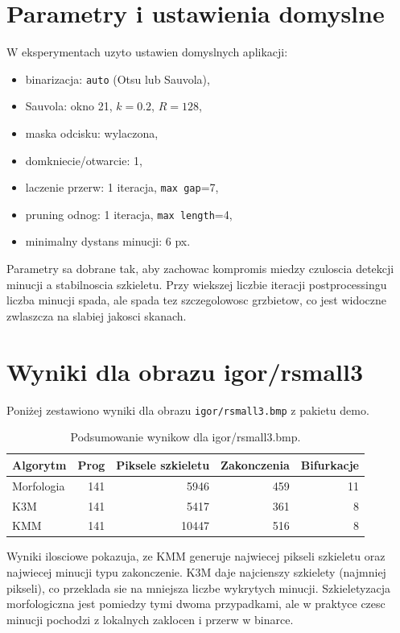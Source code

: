 \documentclass[12pt,a4paper]{article}
\begin{document}
\section{Parametry i ustawienia domyslne}

W eksperymentach uzyto ustawien domyslnych aplikacji:
\begin{itemize}
    \item binarizacja: \texttt{auto} (Otsu lub Sauvola),
    \item Sauvola: okno 21, \(k=0.2\), \(R=128\),
    \item maska odcisku: wylaczona,
    \item domkniecie/otwarcie: 1,
    \item laczenie przerw: 1 iteracja, \texttt{max gap}=7,
    \item pruning odnog: 1 iteracja, \texttt{max length}=4,
    \item minimalny dystans minucji: 6 px.
\end{itemize}

Parametry sa dobrane tak, aby zachowac kompromis miedzy czuloscia detekcji minucji
a stabilnoscia szkieletu. Przy wiekszej liczbie iteracji postprocessingu liczba minucji
spada, ale spada tez szczegolowosc grzbietow, co jest widoczne zwlaszcza na slabiej
jakosci skanach.

\section{Wyniki dla obrazu igor/rsmall3}

Poniżej zestawiono wyniki dla obrazu \texttt{igor/rsmall3.bmp} z pakietu demo.

\begin{table}[H]
    \centering
    \caption{Podsumowanie wynikow dla igor/rsmall3.bmp.}
    \begin{tabular}{lrrrr}
        \toprule
        Algorytm & Prog & Piksele szkieletu & Zakonczenia & Bifurkacje \\
        \midrule
        Morfologia & 141 & 5946 & 459 & 11 \\
        K3M & 141 & 5417 & 361 & 8 \\
        KMM & 141 & 10447 & 516 & 8 \\
        \bottomrule
    \end{tabular}
\end{table}

Wyniki ilosciowe pokazuja, ze KMM generuje najwiecej pikseli szkieletu oraz najwiecej minucji typu
zakonczenie. K3M daje najcienszy szkielety (najmniej pikseli), co przeklada sie na mniejsza liczbe
wykrytych minucji. Szkieletyzacja morfologiczna jest pomiedzy tymi dwoma przypadkami, ale w praktyce
czesc minucji pochodzi z lokalnych zaklocen i przerw w binarce.
\end{document}
